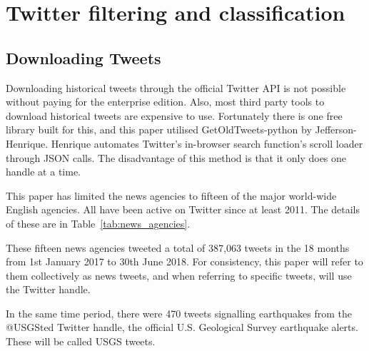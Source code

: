 \chapter{Twitter filtering and classification}

\section{Downloading Tweets}

Downloading historical tweets through the official Twitter API is not possible without paying for the enterprise edition\cite{Twitter_api}. Also, most third party tools to download historical tweets are expensive to use. Fortunately there is one free library built for this, and this paper utilised GetOldTweets-python by Jefferson-Henrique\cite{getoldtweets}. Henrique automates Twitter's in-browser search function's scroll loader through JSON calls. The disadvantage of this method is that it only does one handle at a time.

This paper has limited the news agencies to fifteen of the major world-wide English agencies. All have been active on Twitter since at least 2011. The details of these are in Table~\ref{tab:news_agencies}.

These fifteen news agencies tweeted a total of 387,063 tweets in the 18 months from 1st January 2017 to 30th June 2018. For consistency, this paper will refer to them collectively as news tweets, and when referring to specific tweets, will use the Twitter handle.

In the same time period, there were 470 tweets signalling earthquakes from the @USGSted Twitter handle, the official U.S. Geological Survey earthquake alerts. These will be called USGS tweets.

